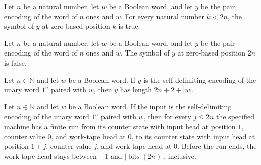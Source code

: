\begin{lemma}
\label{Complexity.LogProg.Dbl.sym_lt}
\leanok
{}
Let $n$ be a natural number, let $w$ be a Boolean word, and let $y$ be the pair encoding
of the word of $n$ ones and $w$. For every natural number $k<2n$, the symbol of $y$ at
zero-based position $k$ is true.
\end{lemma}

\begin{lemma}
\label{Complexity.LogProg.Dbl.sym_eq}
\leanok
{}
Let $n$ be a natural number, let $w$ be a Boolean word, and let $y$ be the pair encoding
of the word of $n$ ones and $w$. The symbol of $y$ at zero-based position $2n$ is false.
\end{lemma}

\begin{lemma}
\label{Complexity.LogProg.Dbl.length_eq}
\leanok
{}
Let $n\in\mathbb{N}$ and let $w$ be a Boolean word. If $y$ is the self-delimiting
encoding of the unary word $1^n$ paired with $w$, then $y$ has length $2n+2+|w|$.
\end{lemma}

\begin{lemma}
\label{Complexity.LogProg.Dbl.count}
\leanok
{}
Let $n\in\mathbb{N}$ and let $w$ be a Boolean word. If the input is the self-delimiting
encoding of the unary word $1^n$ paired with $w$, then for every $j\le 2n$ the specified
machine has a finite run from its counter state with input head at position $1$, counter
value $0$, and work-tape head at $0$, to its counter state with input head at position
$1+j$, counter value $j$, and work-tape head at $0$. Before the run ends, the work-tape
head stays between $-1$ and $\lvert\operatorname{bits}(2n)\rvert$, inclusive.
\end{lemma}

